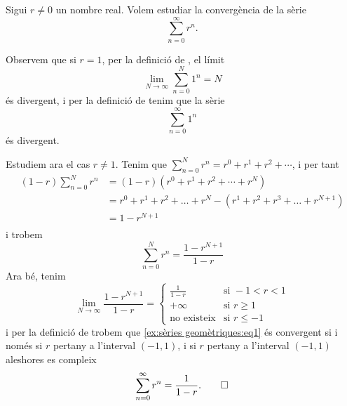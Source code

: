 \documentclass[../Apunts.tex]{subfiles}
\begin{document}
	\begin{example}
		\label{ex:sèries geomètriques}
		Sigui \(r\neq0\) un nombre real. Volem estudiar la convergència de la sèrie
		\begin{equation}
			\label{ex:sèries geomètriques:eq1}
			\sum_{n=0}^{\infty}r^{n}.
		\end{equation}
		\begin{solution}
			Observem que si \(r=1\), per la definició de , el límit
			\[\lim_{N\to\infty}\sum_{n=0}^{N}1^{n}=N\]
			és divergent, i per la definició de  tenim que la sèrie
			\[\sum_{n=0}^{\infty}1^{n}\]
			és divergent.
			
			Estudiem ara el cas \(r\neq1\). Tenim que \(\sum_{n=0}^{N}r^{n}=r^{0}+r^{1}+r^{2}+\cdots\), i per tant
			\begin{align*}
				(1-r)\sum_{n=0}^{N}r^{n}&=(1-r)(r^{0}+r^{1}+r^{2}+\cdots+r^{N})\\
				&=r^{0}+r^{1}+r^{2}+\dots+r^{N}-(r^{1}+r^{2}+r^{3}+\dots+r^{N+1})\\
				&=1-r^{N+1}\\
			\end{align*}
			i trobem
			\begin{equation*}
				\sum_{n=0}^{N}r^{n}=\frac{1-r^{N+1}}{1-r}
			\end{equation*}
			Ara bé, tenim
			\[\lim_{N\to\infty}\frac{1-r^{N+1}}{1-r}=
			\begin{cases}
				\displaystyle \frac{1}{1-r} & \text{si }-1<r<1 \\
				+\infty & \text{si }r\geq1 \\
				\text{no existeix} & \text{si }r\leq-1 
			\end{cases}\]
			i per la definició de  trobem que \eqref{ex:sèries geomètriques:eq1} és convergent si i només si \(r\) pertany a l'interval \((-1,1)\), i si \(r\) pertany a l'interval \((-1,1)\) aleshores es compleix
			\begin{equation*}
				\sum_{n=0}^{\infty}r^{n}=\frac{1}{1-r}.\qedhere
			\end{equation*}
		\end{solution}
	\end{example}
\end{document}
